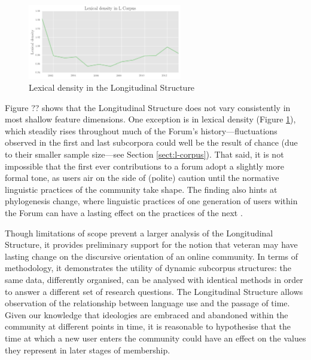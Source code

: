 
\begin{figure}[htb]
\centering
\includegraphics[width=0.6\textwidth]{../images/lexical-density-in-l-corpus.png}
\caption{Lexical density in the Longitudinal Structure}
\label{fig:lex_dens_L}
\end{figure}



Figure ?? shows that the Longitudinal Structure does not vary consistently in most shallow feature dimensions. One exception is in lexical density (Figure \ref{fig:lex_dens_L}), which steadily rises throughout much of the \gls{Forum}'s history---fluctuations observed in the first and last subcorpora could well be the result of chance (due to their smaller sample size---see Section \ref{sect:l-corpus}). That said, it is not impossible that the first ever contributions to a \gls{forum} adopt a slightly more formal tone, as users air on the side of (polite) caution until the normative linguistic practices of the community take shape. The finding also hints at phylogenesis change, where linguistic practices of one generation of users within the \gls{Forum} can have a lasting effect on the practices of the next \cite{danescu-niculescu-mizil_no_2013}.

Though limitations of scope prevent a larger analysis of the Longitudinal Structure, it provides preliminary support for the notion that veteran  may have lasting change on the discursive orientation of an online community. In terms of methodology, it demonstrates the utility of dynamic subcorpus structures: the same data, differently organised, can be analysed with identical methods in order to answer a different set of research questions. The Longitudinal Structure allows observation of the relationship between language use and the passage of time. Given our knowledge that ideologies are embraced and abandoned within the community at different points in time, it is reasonable to hypothesise that the time at which a new user enters the community could have an effect on the values they represent in later stages of membership. 

